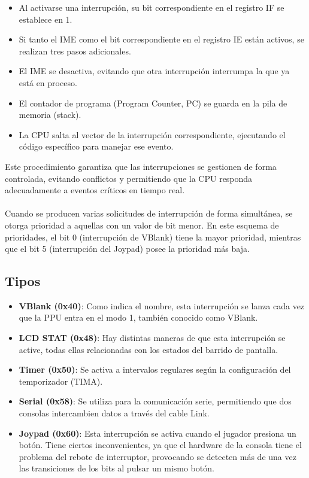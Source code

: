\begin{itemize}
    \item Al activarse una interrupción, su bit correspondiente en el registro IF se establece en 1.
    \item Si tanto el IME como el bit correspondiente en el registro IE están activos, se realizan tres pasos adicionales.
    \item El IME se desactiva, evitando que otra interrupción interrumpa la que ya está en proceso.
    \item El contador de programa (Program Counter, PC) se guarda en la pila de memoria (stack).
    \item La CPU salta al vector de la interrupción correspondiente, ejecutando el código específico para manejar ese evento.
\end{itemize}
    
Este procedimiento garantiza que las interrupciones se gestionen de forma controlada, evitando conflictos y permitiendo que la CPU responda adecuadamente a eventos críticos en tiempo real.
\\\\
Cuando se producen varias solicitudes de interrupción de forma simultánea, se otorga prioridad a aquellas con un valor de bit menor. En este esquema de prioridades, el bit 0 (interrupción de VBlank) tiene la mayor prioridad, mientras que el bit 5 (interrupción del Joypad) posee la prioridad más baja.

\subsection{Tipos}

\begin{itemize}
    \item \textbf{VBlank (0x40)}: Como indica el nombre, esta interrupción se lanza cada vez que la PPU entra en el modo 1, también conocido como VBlank.
    \item \textbf{LCD STAT (0x48)}: Hay distintas maneras de que esta interrupción se active, todas ellas relacionadas con los estados del barrido de pantalla.
    \item \textbf{Timer (0x50)}: Se activa a intervalos regulares según la configuración del temporizador (TIMA).
    \item \textbf{Serial (0x58)}: Se utiliza para la comunicación serie, permitiendo que dos consolas intercambien datos a través del cable Link.
    \item \textbf{Joypad (0x60)}: Esta interrupción se activa cuando el jugador presiona un botón. Tiene ciertos inconvenientes, ya que el hardware de la consola tiene el problema del rebote de interruptor, provocando se detecten más de una vez las transiciones de los bits al pulsar un mismo botón.
\end{itemize}
\label{interrupttype}

